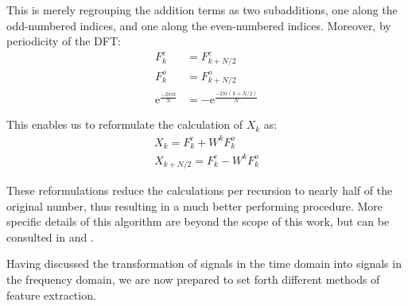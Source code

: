 \documentclass[../main.tex]{subfiles} \label{chapter_soa}
\begin{document}
\par This is merely regrouping the addition terms as two subadditions, one along the odd-numbered indices, and one along the even-numbered indices. Moreover, by periodicity of the DFT:
\begin{align*}
F^e_k &= F^e_{k+N/2}\\
F^o_k &= F^o_{k+N/2}\\
\mathrm{e}^ {\frac{-2\pi ik}{N} } &= -\mathrm{e}^ {\frac{-2\pi i(k+N/2)}{N} }
\end{align*}
\par This enables us to reformulate the calculation of $X_k$ as:
\begin{align*}
X_k = F^e_k + W^kF^o_k\\
X_{k+N/2} = F^e_k - W^kF^o_k
\end{align*}
\par These reformulations reduce the calculations per recursion to nearly half of the original number, thus resulting in a much better performing procedure. More specific details of this algorithm are beyond the scope of this work, but can be consulted in \cite{Smith2011} and \cite{Cooley1965}.
\par Having discussed the transformation of signals in the time domain into signals in the frequency domain, we are now prepared to set forth different methods of feature extraction.
\end{document}
